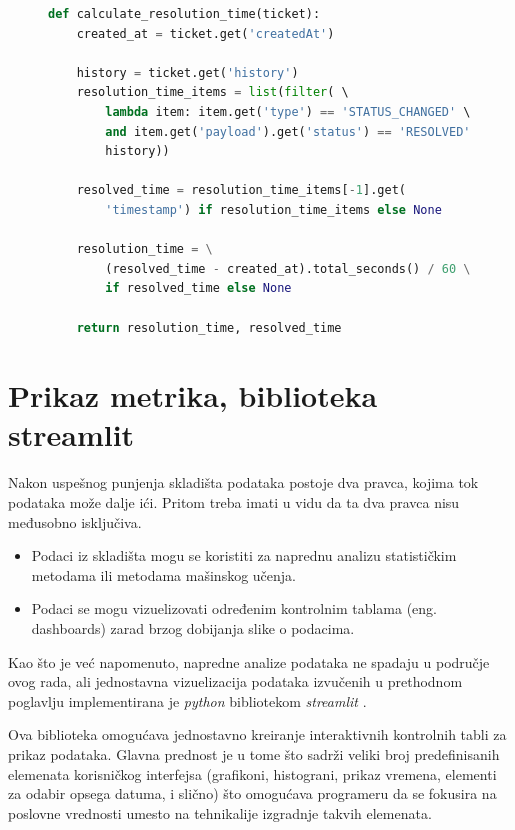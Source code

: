 \documentclass[12pt,oneside]{memoir}
\begin{document}
\begin{figure}[h]
\begin{lstlisting}[language=python, caption={Računanje konkretne metrike.}, label={lst:ticketetlconcretefunction}]
def calculate_resolution_time(ticket):
    created_at = ticket.get('createdAt')

    history = ticket.get('history')
    resolution_time_items = list(filter( \ 
        lambda item: item.get('type') == 'STATUS_CHANGED' \
        and item.get('payload').get('status') == 'RESOLVED', \
        history))

    resolved_time = resolution_time_items[-1].get(
        'timestamp') if resolution_time_items else None

    resolution_time = \
        (resolved_time - created_at).total_seconds() / 60 \
        if resolved_time else None

    return resolution_time, resolved_time
\end{lstlisting}
\end{figure}



\newpage
\section{Prikaz metrika, biblioteka streamlit}

Nakon uspešnog punjenja skladišta podataka postoje dva pravca, kojima tok podataka može dalje ići. Pritom treba imati u vidu da ta dva pravca nisu međusobno isključiva.
\begin{itemize}
    \item Podaci iz skladišta mogu se koristiti za naprednu analizu statističkim metodama ili metodama mašinskog učenja.
    \item Podaci se mogu vizuelizovati određenim kontrolnim tablama (eng. dashboards) zarad brzog dobijanja slike o podacima.
\end{itemize}

Kao što je već napomenuto, napredne analize podataka ne spadaju u područje ovog rada, ali jednostavna vizuelizacija podataka izvučenih u prethodnom poglavlju implementirana je \textit{python} bibliotekom \textit{streamlit} \cite{streamlitdocs}.

Ova biblioteka omogućava jednostavno kreiranje interaktivnih kontrolnih tabli za prikaz podataka. Glavna prednost je u tome što sadrži veliki broj predefinisanih elemenata korisničkog interfejsa (grafikoni, histograni, prikaz vremena, elementi za odabir opsega datuma, i slično) što omogućava programeru da se fokusira na poslovne vrednosti umesto na tehnikalije izgradnje takvih elemenata. 
\end{document}
